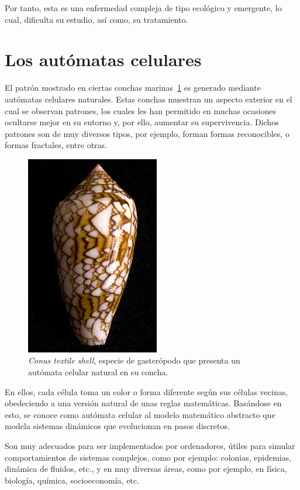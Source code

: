 Por tanto, esta es una enfermedad compleja de tipo ecológico y emergente, lo cual, dificulta su estudio,
así como, su tratamiento.

\section{Los autómatas celulares}

El patrón mostrado en ciertas conchas marinas~\ref{fig:conus} es generado mediante autómatas celulares naturales.
Estas conchas muestran un aspecto exterior en el cual se observan patrones, los cuales les han
permitido en muchas ocasiones ocultarse mejor en su entorno y, por ello, aumentar su supervivencia.
Dichos patrones son de muy diversos tipos, por ejemplo, forman formas reconocibles, o formas fractales,
entre otras.

\begin{figure}[h]
\centering
\includegraphics[scale=2]{figures/Conustextile}
\caption{\textit{Conus textile shell}, especie de gasterópodo que presenta un autómata celular natural en su concha.}
\label{fig:conus}
\end{figure}

En ellos, cada célula toma un color o forma diferente según sus células vecinas, obedeciendo
a una versión natural de unas reglas matemáticas. Basándose en esto, se conoce como autómata celular
al modelo matemático abstracto que modela sistemas dinámicos que evolucionan en pasos discretos.

Son muy adecuados para ser implementados por ordenadores, útiles para simular comportamientos de sistemas
complejos, como por ejemplo: colonias, epidemias, dinámica de fluidos, etc., y en muy diversas áreas, como por ejemplo,
en física, biología, química, socioeconomía, etc.

